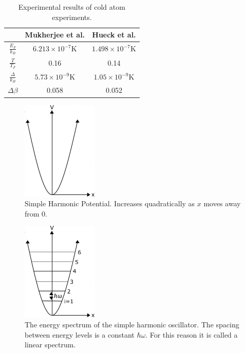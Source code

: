 \begin{table}[H]
    \centering
    \caption{Experimental results of cold atom experiments.}
    \label{tab:experiment}
    \begin{tabular}{||c c c||}
           \hline
         & Mukherjee et al.\@ \cite{Mukherjee2017} & Hueck et al.\@ \cite{Hueck2018} \\ [0.5ex]
         \hline
         $\frac{E_F}{k_B}$ & $6.213\times10^{-7}$K & $1.498\times10^{-7}$K\\ 
         \hline
         $\frac{T}{T_F}$ & 0.16 & 0.14 \\
         \hline
         $\frac{\Delta}{k_B}$ & $5.73\times 10^{-9}$K & $1.05\times 10^{-9}$K\\
         \hline
         $\Delta\beta$ & 0.058 & 0.052 \\ [1ex]
         \hline
    \end{tabular}
\end{table}
\begin{figure}[H]
    \centering
    \includegraphics{figures/pdf/SHOpot.png}
    \caption{Simple Harmonic Potential. Increases quadratically as $x$ moves away from 0.}
    \label{fig:SHOpot}
\end{figure}
\begin{figure}[H]
    \centering
    \includegraphics[scale=1.0]{figures/pdf/SHOspectrum.png}
    \caption{The energy spectrum of the simple harmonic oscillator. The spacing between energy levels is a constant $\hbar\omega$. For this reason it is called a linear spectrum.}
    \label{fig:Simple Harmonic Oscillator Spectrum}
\end{figure}
